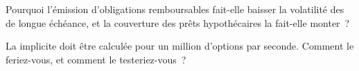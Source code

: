 \begin{interviewq}\label{iq:m2:the-rates-options-market:5}
Pourquoi l'émission d'obligations remboursables fait-elle baisser la volatilité des  de longue échéance, et
la couverture des prêts hypothécaires la fait-elle monter~?
\end{interviewq}

\begin{interviewq}\label{iq:m2:the-rates-options-market:6}
La  implicite doit être calculée pour un million d'options par seconde.
Comment le feriez-vous, et comment le testeriez-vous~?
\end{interviewq}
